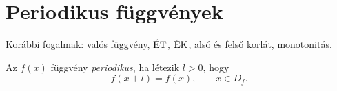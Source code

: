 \documentclass[11pt]{article}
\begin{document}

\section{Periodikus függvények}

Korábbi fogalmak: valós függvény, $\ET$, $\EK$, alsó és felső korlát, monotonitás.

\begin{defbox}
\begin{definition}
Az $f(x)$ függvény \emph{periodikus}, ha létezik $l>0$, hogy
\[
f(x+l)=f(x),\qquad x\in D_{f}.
\]
\end{definition}
\end{defbox}
\end{document}

